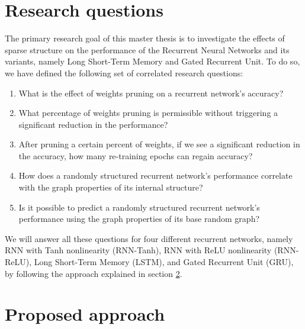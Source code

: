 \newpage
\section{Research questions}\label{section:research_questions}

The primary research goal of this master thesis is to investigate the effects of sparse structure on the performance of the Recurrent Neural Networks and its variants, namely Long Short-Term Memory and Gated Recurrent Unit. To do so, we have defined the following set of correlated research questions:

\begin{enumerate}
	\item\label{rq:q1} What is the effect of weights pruning on a recurrent network's accuracy?
	    
	\item\label{rq:q2} What percentage of weights pruning is permissible without triggering a significant reduction in the performance?
	    
	\item\label{rq:q3} After pruning a certain percent of weights, if we see a significant reduction in the accuracy,  how many re-training epochs can regain accuracy?
	    
	\item\label{rq:q4} How does a randomly structured recurrent network's performance correlate with the graph properties of its internal structure?
	
	\item\label{rq:q5} Is it possible to predict a randomly structured recurrent network's performance using the graph properties of its base random graph?
\end{enumerate}

We will answer all these questions for four different recurrent networks, namely RNN with Tanh nonlinearity (RNN-Tanh), RNN with ReLU nonlinearity (RNN-ReLU), Long Short-Term Memory (LSTM), and Gated Recurrent Unit (GRU), by following the approach explained in section \ref{section:proposed_approach}.


\newpage
\section{Proposed approach}\label{section:proposed_approach}

